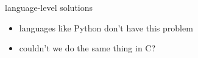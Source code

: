 
\begin{frame}{language-level solutions}
    \begin{itemize}
    \item languages like Python don't have this problem
    \item couldn't we do the same thing in C?
    \end{itemize}
\end{frame}


